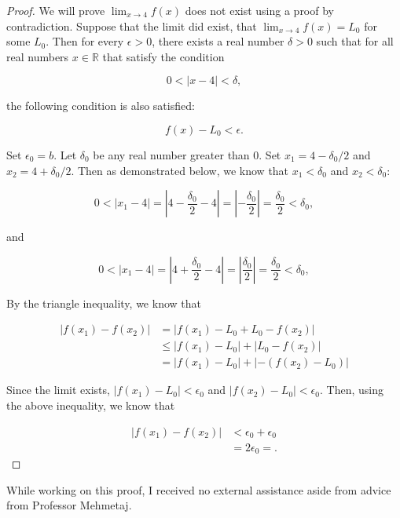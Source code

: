 \documentclass[12pt]{article}
\begin{document}
\begin{proof}
    We will prove $\lim_{x\to 4} f(x) $ does not exist using a proof by contradiction. Suppose that the limit did exist, that $\lim_{x\to 4} f(x) = L_0$ for some $L_0$. Then for every $\epsilon > 0$, there exists a real number $\delta > 0$ such that for all real numbers $x \in \mathbb{R}$ that satisfy the condition

    \[0 < |x - 4| < \delta,\]

    the following condition is also satisfied:

    \[ f(x) - L_0 < \epsilon.\]

    \noindent Set $\epsilon_0 = b$. Let $\delta_0$ be any real number greater than 0. Set $x_1 = 4 - \delta_0/2$ and $x_2 = 4 + \delta_0/2$. Then as demonstrated below, we know that $x_1 < \delta_0$ and $x_2 < \delta_0$:
    
    \[ 0 < |x_1 - 4| = \left| 4 - \frac{\delta_0}{2} - 4 \right| = \left|- \frac{\delta_0}{2} \right| = \frac{\delta_0}{2} < \delta_0, \]

    and

    \[ 0 < |x_1 - 4| = \left| 4 + \frac{\delta_0}{2} - 4 \right| = \left| \frac{\delta_0}{2} \right| = \frac{\delta_0}{2} < \delta_0, \]

    \noindent By the triangle inequality, we know that

    \begin{align*}
        |f(x_1) - f(x_2)| & = |f(x_1) - L_0 + L_0 - f(x_2)| \\
        & \leq |f(x_1) - L_0| + |L_0 - f(x_2)| \tag{1} \\
        & = |f(x_1) - L_0| + |-(f(x_2) - L_0) |
    \end{align*}

    Since the limit exists, $|f(x_1) - L_0| < \epsilon_0$ and $|f(x_2) - L_0| < \epsilon_0$. Then, using the above inequality, we know that

    \begin{align*}
        |f(x_1) - f(x_2)| & < \epsilon_0 + \epsilon_0 \\
        & = 2\epsilon_0 = .
    \end{align*} %

    

\end{proof}

\noindent While working on this proof, I received no external assistance aside from advice from Professor Mehmetaj.
\end{document}
